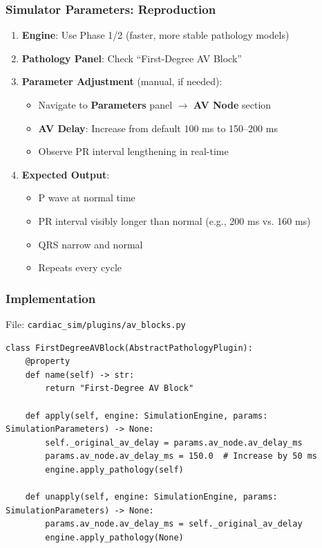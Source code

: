\documentclass[12pt,a4paper,oneside]{book}
\begin{document}
\subsubsection{Simulator Parameters: Reproduction}

\begin{enumerate}
    \item \textbf{Engine}: Use Phase 1/2 (faster, more stable pathology models)
    \item \textbf{Pathology Panel}: Check ``First-Degree AV Block''
    \item \textbf{Parameter Adjustment} (manual, if needed):
    \begin{itemize}
        \item Navigate to \textbf{Parameters} panel $\to$ \textbf{AV Node} section
        \item \textbf{AV Delay}: Increase from default 100 ms to 150–200 ms
        \item Observe PR interval lengthening in real-time
    \end{itemize}
    \item \textbf{Expected Output}:
    \begin{itemize}
        \item P wave at normal time
        \item PR interval visibly longer than normal (e.g., 200 ms vs. 160 ms)
        \item QRS narrow and normal
        \item Repeats every cycle
    \end{itemize}
\end{enumerate}

\subsubsection{Implementation}

File: \texttt{cardiac\_sim/plugins/av\_blocks.py}

\begin{Verbatim}[formatcom=\color{black}]
class FirstDegreeAVBlock(AbstractPathologyPlugin):
    @property
    def name(self) -> str:
        return "First-Degree AV Block"
    
    def apply(self, engine: SimulationEngine, params: SimulationParameters) -> None:
        self._original_av_delay = params.av_node.av_delay_ms
        params.av_node.av_delay_ms = 150.0  # Increase by 50 ms
        engine.apply_pathology(self)
    
    def unapply(self, engine: SimulationEngine, params: SimulationParameters) -> None:
        params.av_node.av_delay_ms = self._original_av_delay
        engine.apply_pathology(None)
\end{Verbatim}
\end{document}

